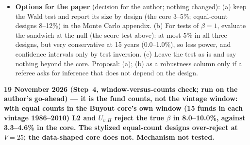 \documentclass[11pt]{article}
\begin{document}
\begin{itemize}
\item \textbf{Options for the paper} (decision for the author; nothing changed): (a) keep the Wald test and report its size by design (the core 3--5\%; equal-count designs 8--12\%) in the Monte Carlo appendix. (b) For tests of $\beta=1$, evaluate the sandwich at the null (the score test above): at most 5\% in all three designs, but very conservative at 15 years (0.0--1.0\%), so less power, and confidence intervals only by test inversion. (c) Leave the test as is and say nothing beyond the core. Proposal: (a); (b) as a robustness column only if a referee asks for inference that does not depend on the design.
\end{itemize}

\textbf{19 November 2026 (Step~4, window-versus-counts check; run on the author's go-ahead) --- it is the fund counts, not the vintage window: with equal counts in the Buyout core's own window (15 funds in each vintage 1986--2010) L2 and $U_{v,H}$ reject the true $\beta$ in 8.0--10.0\%, against 3.3--4.6\% in the core. The stylized equal-count designs over-reject at $V=25$; the data-shaped core does not. Mechanism not tested.}
\end{document}

